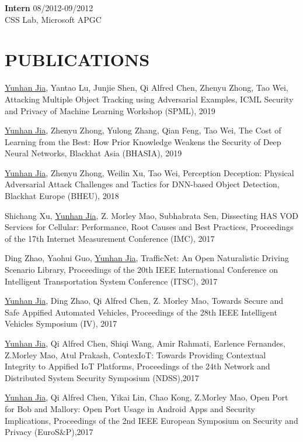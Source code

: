 \documentclass[margin]{res}
\begin{document}
\begin{resume}
\textbf{Intern} \hfill 08/2012-09/2012 \\
CSS Lab, Microsoft APGC


\section{PUBLICATIONS}

\underline{Yunhan Jia}, Yantao Lu, Junjie Shen, Qi Alfred Chen, Zhenyu Zhong, Tao Wei,
Attacking Multiple Object Tracking using Adversarial Examples, ICML Security and Privacy of Machine Learning Workshop (SPML), 2019

\underline{Yunhan Jia}, Zhenyu Zhong, Yulong Zhang, Qian Feng, Tao Wei,
The Cost of Learning from the Best: How Prior Knowledge Weakens the Security of Deep Neural Networks, Blackhat Asia (BHASIA), 2019

\underline{Yunhan Jia}, Zhenyu Zhong, Weilin Xu, Tao Wei,
Perception Deception: Physical Adversarial Attack Challenges and Tactics for DNN-based Object Detection, Blackhat Europe (BHEU), 2018

Shichang Xu, \underline{Yunhan Jia}, Z. Morley Mao, Subhabrata Sen,
Dissecting HAS VOD Services for Cellular: Performance, Root Causes and Best Practices, Proceedings of the 17th Internet Measurement Conference (IMC), 2017

Ding Zhao, Yaohui Guo, \underline{Yunhan Jia}, 
TrafficNet: An Open Naturalistic Driving Scenario Library, Proceedings of the 20th IEEE International Conference on Intelligent Transportation System Conference (ITSC), 2017 \href{http://web.eecs.umich.edu/\~jackjia/material/trafficnet\_itsc17.pdf}{\color{blue}{[PDF]}}

\underline{Yunhan Jia}, Ding Zhao, Qi Alfred Chen, Z. Morley Mao,
Towards Secure and Safe Appified Automated Vehicles, Proceedings of the 28th IEEE Intelligent Vehicles Symposium (IV), 2017 \href{https://arxiv.org/pdf/1702.06827.pdf}{\color{blue}{[PDF]}}

\underline{Yunhan Jia}, Qi Alfred Chen, Shiqi Wang, Amir Rahmati, Earlence Fernandes, Z.Morley Mao, Atul Prakash, 
ContexIoT: Towards Providing Contextual Integrity to Appified IoT Platforms, Proceedings of the 24th Network and Distributed System Security Symposium (NDSS),2017 \href{http://web.eecs.umich.edu/\~jackjia/material/contexiot\_ndss17.pdf}{\color{blue}{[PDF]}}

\underline{Yunhan Jia}, Qi Alfred Chen, Yikai Lin, Chao Kong, Z.Morley Mao, 
Open Port for Bob and Mallory: Open Port Usage in Android Apps and Security Implications, Proceedings of the 2nd IEEE European Symposium on Security and Privacy (EuroS\&P),2017 \href{http://web.eecs.umich.edu/\~jackjia/material/open\_euro17.pdf}{\color{blue}{[PDF]}}


\end{resume}
\end{document}
